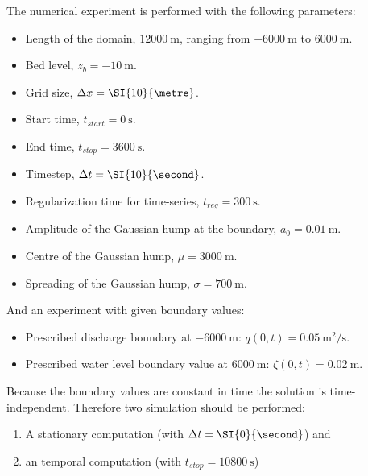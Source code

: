 The numerical experiment is performed with the following parameters:
\begin{itemize}
    \item Length of the domain, $\SI{12000}{\metre}$, ranging from $\SI{-6000}{\metre}$ to $\SI{6000}{\metre}$.
    \item Bed level, $z_b = \SI{-10}{\metre}$.
    \item Grid size, $\Dx = \SI{10}{\metre}$.
    \item Start time, $t_{start} = \SI{0}{\second}$.
    \item End time, $t_{stop} = \SI{3600}{\second}$.
    \item Timestep, $\Dt = \SI{10}{\second}$.
    \item Regularization time for time-series, $t_{reg} = \SI{300}{\second}$.
    \item Amplitude of the Gaussian hump at the boundary, $a_0 = \SI{0.01}{\metre}$.
    \item Centre of the Gaussian hump, $\mu = \SI{3000}{\metre}$.
    \item Spreading of the Gaussian hump, $\sigma = \SI{700}{\metre}$.
\end{itemize}
And an experiment with given boundary values:
\begin{itemize}
    \item Prescribed discharge boundary at $\SI{-6000}{\metre}$: $q(0,t) = \SI{0.05}{\square\metre\per\second}$.
    \item Prescribed water level boundary value at $\SI{6000}{\metre}$: $\zeta(0,t) = \SI{0.02}{\metre}$.
\end{itemize}
Because the boundary values are constant in time the solution is time-independent.
Therefore two simulation should be performed:
\begin{enumerate}
    \item A stationary computation (with $\Dt = \SI{0}{\second}$) and
    \item an temporal computation (with $t_{stop} = \SI{10800}{\second}$)
\end{enumerate}
